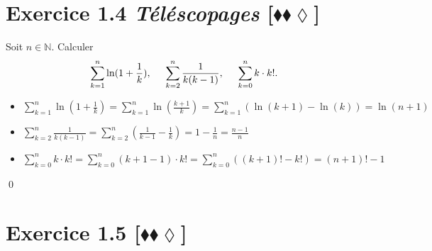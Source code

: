 \documentclass[10pt]{article}
\begin{document}

\section*{Exercice 1.4 \emph{Téléscopages} [$\blacklozenge\blacklozenge\lozenge$]}

\begin{tcolorbox}[enhanced, width=7in, center, size=fbox, fontupper=\large, drop shadow southwest]
    Soit $n\in\mathbb{N}$. Calculer
    \begin{equation*}
        \sum\limits^{n}_{k=1}{\ln(1+\frac{1}{k})}, \hspace{0.5cm} \sum\limits^{n}_{k=2}{\frac{1}{k(k-1)}}, \hspace{0.5cm} \sum\limits_{k=0}^{n}{k\cdot k!}.
    \end{equation*}
    \begin{itemize}
        \item $\sum\limits^{n}_{k=1}{\ln(1+\frac{1}{k})}=\sum\limits^n_{k=1}{\ln(\frac{k+1}{k})}=\sum\limits^n_{k=1}{(\ln(k+1)-\ln(k))}=\ln(n+1)$
        \item $\sum\limits^{n}_{k=2}{\frac{1}{k(k-1)}}=\sum\limits^n_{k=2}{(\frac{1}{k-1}-\frac{1}{k})}=1-\frac{1}{n}=\frac{n-1}{n}$
        \item $\sum\limits_{k=0}^{n}{k\cdot k!}=\sum\limits^n_{k=0}{(k+1-1)\cdot k!}=\sum\limits^n_{k=0}{((k+1)! - k!)}=(n+1)!-1$
    \end{itemize}
    \qed
\end{tcolorbox}


\section*{Exercice 1.5 [$\blacklozenge\blacklozenge\lozenge$]}
\end{document}
